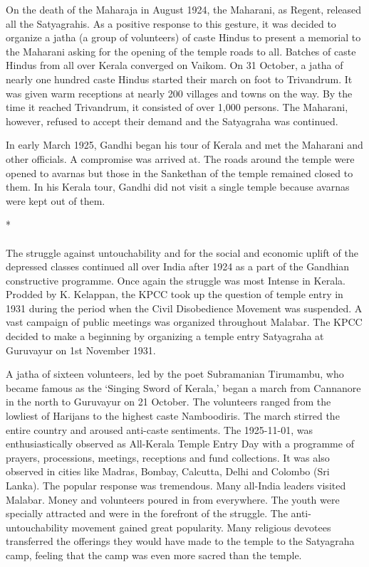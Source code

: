 \begin{multicols}{2}
On the death of the Maharaja in August 1924, the Maharani, as Regent, released all the Satyagrahis. As a positive response to this gesture, it was decided to organize a jatha (a group of volunteers) of caste Hindus to present a memorial to the Maharani asking for the opening of the temple roads to all. Batches of caste Hindus from all over Kerala converged on Vaikom. On 31 October, a jatha of nearly one hundred caste Hindus started their march on foot to Trivandrum. It was given warm receptions at nearly 200 villages and towns on the way. By the time it reached Trivandrum, it consisted of over 1,000 persons. The Maharani, however, refused to accept their demand and the Satyagraha was continued.

In early March 1925, Gandhi began his tour of Kerala and met the Maharani and other officials. A compromise was arrived at. The roads around the temple were opened to avarnas but those in the Sankethan of the temple remained closed to them. In his Kerala tour, Gandhi did not visit a single temple because avarnas were kept out of them.

\begin{center}*\end{center}

\paragraph*{}
The struggle against untouchability and for the social and economic uplift of the depressed classes continued all over India after 1924 as a part of the Gandhian constructive programme. Once again the struggle was most Intense in Kerala. Prodded by K. Kelappan, the KPCC took up the question of temple entry in 1931 during the period when the Civil Disobedience Movement was suspended. A vast campaign of public meetings was organized throughout Malabar. The KPCC decided to make a beginning by organizing a temple entry Satyagraha at Guruvayur on 1st November 1931.

A jatha of sixteen volunteers, led by the poet Subramanian Tirumambu, who became famous as the `Singing Sword of Kerala,' began a march from Cannanore in the north to Guruvayur on 21 October. The volunteers ranged from the lowliest of Harijans to the highest caste Namboodiris. The march stirred the entire country and aroused anti-caste sentiments. The 1925-11-01, was enthusiastically observed as All-Kerala Temple Entry Day with a programme of prayers, processions, meetings, receptions and fund collections. It was also observed in cities like Madras, Bombay, Calcutta, Delhi and Colombo (Sri Lanka). The popular response was tremendous. Many all-India leaders visited Malabar. Money and volunteers poured in from everywhere. The youth were specially attracted and were in the forefront of the struggle. The anti-untouchability movement gained great popularity. Many religious devotees transferred the offerings they would have made to the temple to the Satyagraha camp, feeling that the camp was even more sacred than the temple.


\end{multicols}
